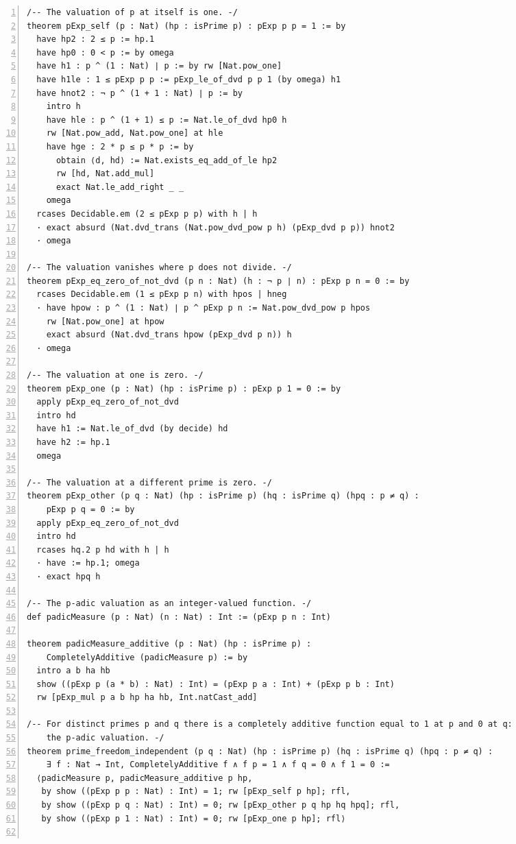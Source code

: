 \documentclass[10pt]{article}
\newcommand{\leansize}{\fontsize{5.5pt}{6.75pt}\selectfont}
\begin{document}
\begin{multicols}{2}
\begin{Verbatim}[numbers=left,firstnumber=1,numbersep=3pt,xleftmargin=2.6em,breaklines=true,breakanywhere=true,breakautoindent=false,breakindent=1.4em,breaksymbolleft={},breakanywheresymbolpre={},fontsize=\leansize]
/-- The valuation of p at itself is one. -/
theorem pExp_self (p : Nat) (hp : isPrime p) : pExp p p = 1 := by
  have hp2 : 2 ≤ p := hp.1
  have hp0 : 0 < p := by omega
  have h1 : p ^ (1 : Nat) ∣ p := by rw [Nat.pow_one]
  have h1le : 1 ≤ pExp p p := pExp_le_of_dvd p p 1 (by omega) h1
  have hnot2 : ¬ p ^ (1 + 1 : Nat) ∣ p := by
    intro h
    have hle : p ^ (1 + 1) ≤ p := Nat.le_of_dvd hp0 h
    rw [Nat.pow_add, Nat.pow_one] at hle
    have hge : 2 * p ≤ p * p := by
      obtain ⟨d, hd⟩ := Nat.exists_eq_add_of_le hp2
      rw [hd, Nat.add_mul]
      exact Nat.le_add_right _ _
    omega
  rcases Decidable.em (2 ≤ pExp p p) with h | h
  · exact absurd (Nat.dvd_trans (Nat.pow_dvd_pow p h) (pExp_dvd p p)) hnot2
  · omega

/-- The valuation vanishes where p does not divide. -/
theorem pExp_eq_zero_of_not_dvd (p n : Nat) (h : ¬ p ∣ n) : pExp p n = 0 := by
  rcases Decidable.em (1 ≤ pExp p n) with hpos | hneg
  · have hpow : p ^ (1 : Nat) ∣ p ^ pExp p n := Nat.pow_dvd_pow p hpos
    rw [Nat.pow_one] at hpow
    exact absurd (Nat.dvd_trans hpow (pExp_dvd p n)) h
  · omega

/-- The valuation at one is zero. -/
theorem pExp_one (p : Nat) (hp : isPrime p) : pExp p 1 = 0 := by
  apply pExp_eq_zero_of_not_dvd
  intro hd
  have h1 := Nat.le_of_dvd (by decide) hd
  have h2 := hp.1
  omega

/-- The valuation at a different prime is zero. -/
theorem pExp_other (p q : Nat) (hp : isPrime p) (hq : isPrime q) (hpq : p ≠ q) :
    pExp p q = 0 := by
  apply pExp_eq_zero_of_not_dvd
  intro hd
  rcases hq.2 p hd with h | h
  · have := hp.1; omega
  · exact hpq h

/-- The p-adic valuation as an integer-valued function. -/
def padicMeasure (p : Nat) (n : Nat) : Int := (pExp p n : Int)

theorem padicMeasure_additive (p : Nat) (hp : isPrime p) :
    CompletelyAdditive (padicMeasure p) := by
  intro a b ha hb
  show ((pExp p (a * b) : Nat) : Int) = (pExp p a : Int) + (pExp p b : Int)
  rw [pExp_mul p a b hp ha hb, Int.natCast_add]

/-- For distinct primes p and q there is a completely additive function equal to 1 at p and 0 at q:
    the p-adic valuation. -/
theorem prime_freedom_independent (p q : Nat) (hp : isPrime p) (hq : isPrime q) (hpq : p ≠ q) :
    ∃ f : Nat → Int, CompletelyAdditive f ∧ f p = 1 ∧ f q = 0 ∧ f 1 = 0 :=
  ⟨padicMeasure p, padicMeasure_additive p hp,
   by show ((pExp p p : Nat) : Int) = 1; rw [pExp_self p hp]; rfl,
   by show ((pExp p q : Nat) : Int) = 0; rw [pExp_other p q hp hq hpq]; rfl,
   by show ((pExp p 1 : Nat) : Int) = 0; rw [pExp_one p hp]; rfl⟩


\end{Verbatim}
\end{multicols}
\end{document}
